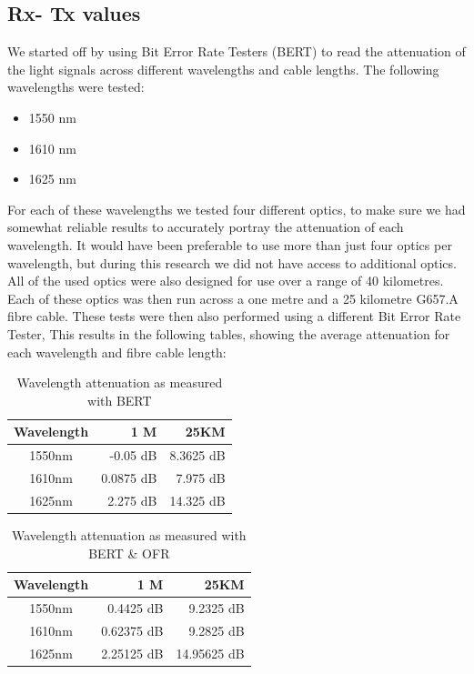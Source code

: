 \documentclass{article}
\begin{document}
\subsection{Rx- Tx values}
We started off by using Bit Error Rate Testers (BERT) to read the attenuation of the light signals across different wavelengths and cable lengths.
The following wavelengths were tested:
\begin{itemize}
	\item 1550 nm
	\item 1610 nm
	\item 1625 nm
\end{itemize}

For each of these wavelengths we tested four different optics, to make sure we had somewhat reliable results to accurately portray the attenuation of each wavelength.
It would have been preferable to use more than just four optics per wavelength, but during this research we did not have access to additional optics.
All of the used optics were also designed for use over a range of 40 kilometres.
Each of these optics was then run across a one metre and a 25 kilometre G657.A fibre cable.
These tests were then also performed using a different Bit Error Rate Tester, 
This results in the following tables, showing the average attenuation for each wavelength and fibre cable length:

\begin{table}[h]
\centering
\label{tab:attenuation-table-ber}
\begin{tabular}{|c|r|r|}
\hline 
\textbf{Wavelength} & \textbf{1 M} & \textbf{25KM}\\ 
\hline 
1550nm & -0.05 dB & 8.3625 dB\\ 
\hline 
1610nm & 0.0875 dB & 7.975 dB\\ 
\hline 
1625nm & 2.275 dB & 14.325 dB\\
\hline
\end{tabular} 
\caption{Wavelength attenuation as measured with BERT}
\end{table}

\begin{table}[h]
\centering
\label{tab:attenuation-table-ofr}
\begin{tabular}{|c|r|r|}
\hline 
\textbf{Wavelength} & \textbf{1 M} & \textbf{25KM}\\ 
\hline 
1550nm & 0.4425 dB & 9.2325 dB\\ 
\hline 
1610nm & 0.62375 dB & 9.2825 dB\\ 
\hline 
1625nm & 2.25125 dB & 14.95625 dB\\
\hline
\end{tabular}
\caption{Wavelength attenuation as measured with BERT \& OFR}
\end{table}
\end{document}
